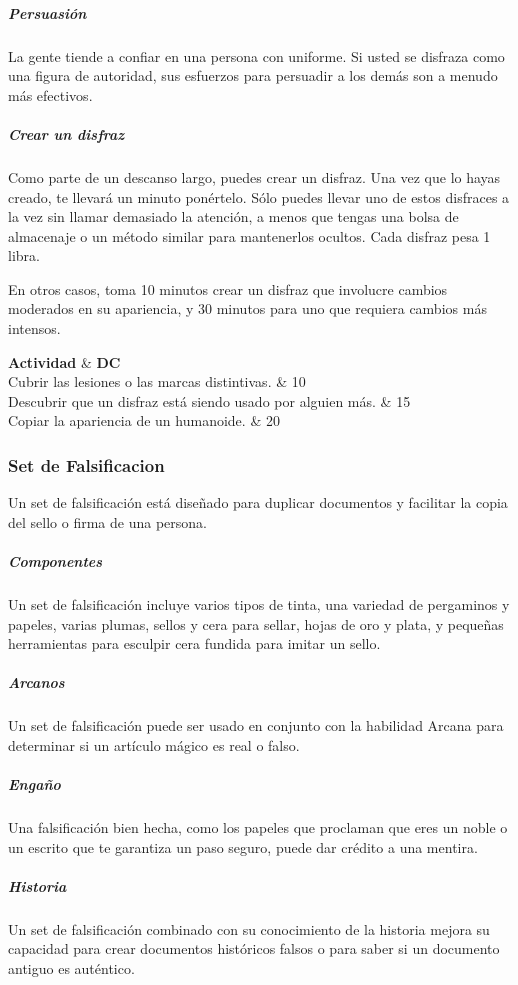 \documentclass[a4paper,twocolumn,openany,10pt]{dndbook}
\begin{document}
\subparagraph{Persuasión} La gente tiende a confiar en una persona con uniforme. Si usted se disfraza como una figura de
autoridad, sus esfuerzos para persuadir a los demás son a menudo más efectivos.

\subparagraph{Crear un disfraz} Como parte de un descanso largo, puedes crear un disfraz. Una vez que lo hayas creado, te llevará
un minuto ponértelo. Sólo puedes llevar uno de estos disfraces a la vez sin llamar demasiado la atención, a menos que tengas una
bolsa de almacenaje o un método similar para mantenerlos ocultos. Cada disfraz pesa 1 libra.

En otros casos, toma 10 minutos crear un disfraz que involucre cambios moderados en su apariencia, y 30 minutos para uno que
requiera cambios más intensos.

\begin{dndtable}[Xc]
	\textbf{Actividad}												& \textbf{DC}	\\
	Cubrir las lesiones o las marcas distintivas.					& 10	\\
	Descubrir que un disfraz está siendo usado por alguien más.		& 15	\\
	Copiar la apariencia de un humanoide.							& 20	\\
\end{dndtable}

\subsubsection*{Set de Falsificacion}
Un set de falsificación está diseñado para duplicar documentos y facilitar la copia del sello o firma de una persona.

\subparagraph{Componentes} Un set de falsificación incluye varios tipos de tinta, una variedad de pergaminos y papeles, varias
plumas, sellos y cera para sellar, hojas de oro y plata, y pequeñas herramientas para esculpir cera fundida para imitar un sello.

\subparagraph{Arcanos} Un set de falsificación puede ser usado en conjunto con la habilidad Arcana para determinar si un artículo
mágico es real o falso.

\subparagraph{Engaño} Una falsificación bien hecha, como los papeles que proclaman que eres un noble o un escrito que te garantiza
un paso seguro, puede dar crédito a una mentira.

\subparagraph{Historia} Un set de falsificación combinado con su conocimiento de la historia mejora su capacidad para crear
documentos históricos falsos o para saber si un documento antiguo es auténtico.
\end{document}
